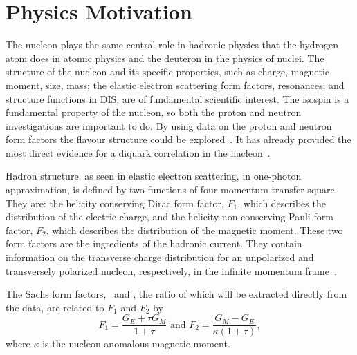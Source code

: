 %
\section{Physics Motivation}

\indent
The nucleon plays the same central role in hadronic physics that the hydrogen atom does in atomic physics and the deuteron in the physics of nuclei.
The structure of the nucleon and its specific properties, such as charge, magnetic moment, size, mass; the elastic electron scattering form factors, resonances; and structure functions in DIS, are of fundamental scientific interest.
The isospin is a fundamental property of the nucleon, so both the proton and neutron investigations are important to do.
By using data on the proton and neutron form factors the flavour structure could be explored~\cite{Cates:2011pz}.
It has already provided the most direct evidence for a diquark correlation in the nucleon~\cite{Roberts:2007jh, Segovia:2014aza, Wojtsekhowski:2020tlo}.

Hadron structure, as seen in elastic electron scattering, in one-photon approximation, is defined by two functions of four momentum transfer square.
They are: the helicity conserving Dirac form factor, $F_1$, which describes the distribution of the electric charge, and the helicity non-conserving Pauli form factor, $F_2$, which describes the distribution of the magnetic moment.
These two form factors are the ingredients of the hadronic current.  
They contain information on the transverse charge distribution for an unpolarized and transversely polarized nucleon, respectively, 
in the infinite momentum frame~\cite{Miller:2007uy, Carlson:2007xd}.

The Sachs form factors, \gef~and \gmf, the ratio of which will be extracted directly from the data, are related to $F_1$ and $F_2$ by
%
\begin{equation}
F_{1} = \frac{G_{E} + \tau G_{M}}{1+\tau} \mbox{  and  }
F_{2} = \frac{G_{M} - G_{E}}{\kappa (1+\tau)},
\label{eq:f1f2}
\end{equation}
%
where $\kappa$ is the nucleon anomalous magnetic moment.

